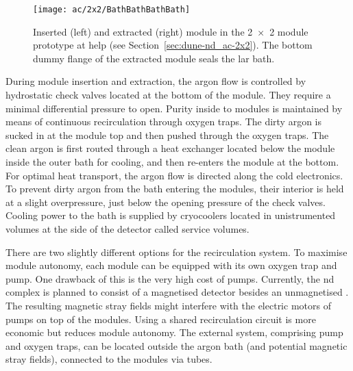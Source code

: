 \begin{figure}[htb]
	\centering
	\texttt{[image: ac/2x2/BathBathBathBath]}
	\caption[\AC{} module insertion and extraction]{%
		Inserted (left) and extracted (right) \AC{} module in the \num{2 x 2} module prototype at \acrshort{help} (see Section~\ref{sec:dune-nd_ac-2x2}).
		The bottom dummy flange of the extracted module seals the \acrshort{lar} bath.
	}
	\label{fig:ac_module-ins-ext}
\end{figure}

During module insertion and extraction, the argon flow is controlled by hydrostatic check valves located at the bottom of the module.
They require a minimal differential pressure to open.
Purity inside to modules is maintained by means of continuous \lar{} recirculation through oxygen traps.
The dirty argon is sucked in at the module top and then pushed through the oxygen traps.
The clean argon is first routed through a heat exchanger located below the module inside the outer bath for cooling, and then re-enters the module at the bottom.
For optimal heat transport, the argon flow is directed along the cold electronics.
To prevent dirty argon from the bath entering the modules, their interior is held at a slight overpressure, just below the opening pressure of the check valves.
Cooling power to the bath is supplied by cryocoolers located in unistrumented volumes at the side of the detector called service volumes.

There are two slightly different options for the recirculation system.
To maximise module autonomy, each module can be equipped with its own oxygen trap and \lar{} pump.
One drawback of this is the very high cost of \lar{} pumps.
Currently, the \dune{} \gls{nd} complex is planned to consist of a magnetised detector besides an unmagnetised \lartpc{}.
The resulting magnetic stray fields might interfere with the electric motors of \lar{} pumps on top of the modules.
Using a shared recirculation circuit is more economic but reduces module autonomy.
The external system, comprising pump and oxygen traps, can be located outside the argon bath (and potential magnetic stray fields), connected to the modules via tubes.

